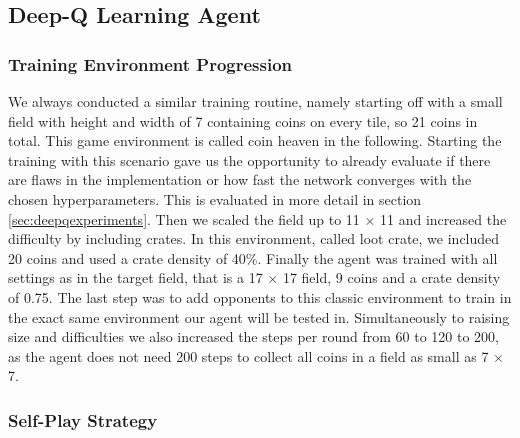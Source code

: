 \subsection{Deep-Q Learning Agent} \label{sec:deepqtraining}

\subsubsection{Training Environment Progression}

We always conducted a similar training routine, namely starting off with a small field with height and width of 7 containing coins on every tile, so 21 coins in total. This game environment is called coin heaven in the following. Starting the training with this scenario gave us the opportunity to already evaluate if there are flaws in the implementation or how fast the network converges with the chosen hyperparameters. This is evaluated in more detail in section \ref{sec:deepqexperiments}. Then we scaled the field up to 11 $\times$ 11 and increased the difficulty by including crates. In this environment, called loot crate, we included 20 coins and used a crate density of 40\%. Finally the agent was trained with all settings as in the target field, that is a 17 $\times$ 17 field, 9 coins and a crate density of 0.75. The last step was to add opponents to this classic environment to train in the exact same environment our agent will be tested in. Simultaneously to raising size and difficulties we also increased the steps per round from 60 to 120 to 200, as the agent does not need 200 steps to collect all coins in a field as small as 7 $\times$ 7.

\subsubsection{Self-Play Strategy}

